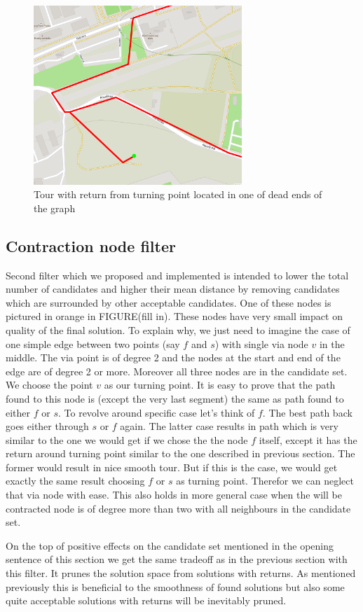 \documentclass{ctuthesis}
\begin{document}
\begin{figure}
	\includegraphics[width=0.7\textwidth]{return.png}
	\caption{Tour with return from turning point located in one of dead ends of the graph}
\end{figure}

\subsection{Contraction node filter} 
Second filter which we proposed and implemented is intended to lower the total number of candidates and higher their mean distance by removing candidates which are surrounded by other acceptable candidates. One of these nodes is pictured in orange in FIGURE(fill in). These nodes have very small impact on quality of the final solution. To explain why, we just need to imagine the case of one simple edge between two points (say \(f\) and \(s\)) with single via node \(v\) in the middle. The via point is of degree 2 and the nodes at the start and end of the edge are of degree 2 or more. Moreover all three nodes are in the candidate set. We choose the point \(v\) as our turning point. It is easy to prove that the path found to this node is (except the very last segment) the same as path found to either \(f\) or \(s\). To revolve around specific case let's think of \(f\). The best path back goes either through \(s\) or \(f\) again. The latter case results in path which is very similar to the one we would get if we chose the the node \(f\) itself, except it has the return around turning point similar to the one described in previous section. The former would result in nice smooth tour. But if this is the case, we would get exactly the same result choosing \(f\) or \(s\) as turning point. Therefor we can neglect that via node with ease. This also holds in more general case when the will be contracted node is of degree more than two with all neighbours in the candidate set. \par
On the top of positive effects on the candidate set mentioned in the opening sentence of this section we get the same tradeoff as in the previous section with this filter. It prunes the solution space from solutions with returns. As mentioned previously this is beneficial to the smoothness of found solutions but also some quite acceptable solutions with returns will be inevitably pruned.
\end{document}

